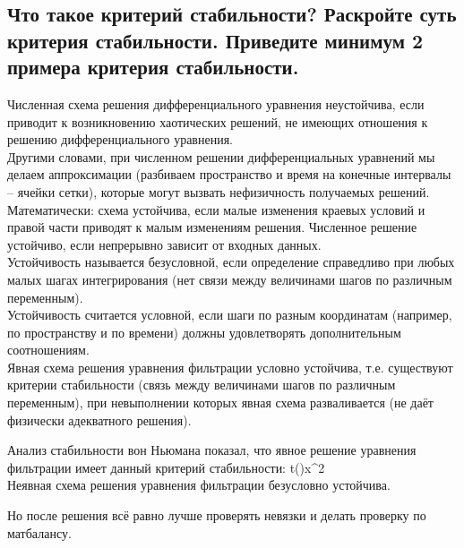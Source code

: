 

\subsection{Что такое критерий стабильности? Раскройте суть критерия стабильности. Приведите минимум 2 примера критерия стабильности.}

Численная схема решения дифференциального уравнения неустойчива, если приводит к возникновению хаотических решений, не имеющих отношения к решению дифференциального уравнения.
\\

Другими словами, при численном решении дифференциальных уравнений мы делаем аппроксимации (разбиваем пространство и время на конечные интервалы -- ячейки сетки), которые могут вызвать нефизичность получаемых решений.
\\

Математически: схема устойчива, если малые изменения краевых условий и правой части приводят к малым изменениям решения.
Численное решение устойчиво, если непрерывно зависит от входных данных.
\\

Устойчивость называется безусловной, если определение справедливо при любых малых шагах интегрирования (нет связи между величинами шагов по различным переменным).
\\

Устойчивость считается условной, если шаги по разным координатам (например, по пространству и по времени) должны удовлетворять дополнительным соотношениям.
\\

Явная схема решения уравнения фильтрации условно устойчива, т.е. существуют критерии стабильности (связь между величинами шагов по различным переменным), при невыполнении которых явная схема разваливается (не даёт физически адекватного решения).

Анализ стабильности вон Ньюмана показал, что явное решение уравнения фильтрации имеет данный критерий стабильности:
\beq
\Delta t\leqslant{}\left(\right)\Delta x^2
\eeq
\ \\

Неявная схема решения уравнения фильтрации безусловно устойчива.

Но после решения всё равно лучше проверять невязки и делать проверку по матбалансу.

